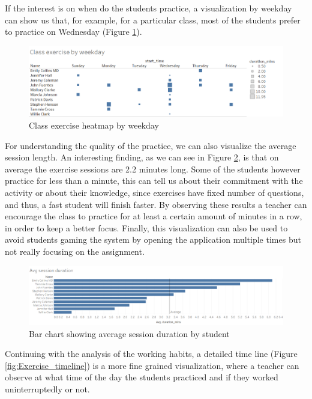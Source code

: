 If the interest is on when do the students practice, a visualization by weekday can show us that, for example, for a particular class, most of the students prefer to practice on Wednesday (Figure \ref{fig:Class_exercise_by_weekday}).

\begin{figure}[bth]
	\centering
	\includegraphics[width=1\linewidth]{gfx/Class_exercise_by_weekday}
	\caption{Class exercise heatmap by weekday}
	\label{fig:Class_exercise_by_weekday}
\end{figure}

For understanding the quality of the practice, we can also visualize the average session length. An interesting finding, as we can see in Figure \ref{fig:Avg_exercise_session_duration}, is that on average the exercise sessions are 2.2 minutes long. Some of the students however practice for less than a minute, this can tell us about their commitment with the activity or about their knowledge, since exercises have fixed number of questions, and thus, a fast student will finish faster. By observing these results a teacher can encourage the class to practice for at least a certain amount of minutes in a row, in order to keep a better focus. Finally, this visualization can also be used to avoid students gaming the system by opening the application multiple times but not really focusing on the assignment.

\begin{figure}[bth]
	\centering
	\includegraphics[width=1\linewidth]{gfx/Avg_exercise_session_duration}
	\caption{Bar chart showing average session duration by student}
	\label{fig:Avg_exercise_session_duration}
\end{figure}

Continuing with the analysis of the working habits, a detailed time line (Figure \ref{fig:Exercise_timeline}) is a more fine grained visualization, where a teacher can observe at what time of the day the students practiced and if they worked uninterruptedly or not.

